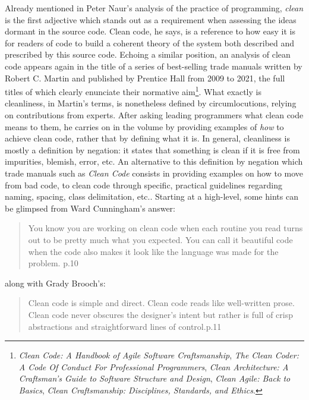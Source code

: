 Already mentioned in Peter Naur's analysis of the practice of programming, \emph{clean} is the first adjective which stands out as a requirement when assessing the ideas dormant in the source code. Clean code, he says, is a reference to how easy it is for readers of code to build a coherent theory of the system both described and prescribed by this source code\cite{naur_programming_1985}. Echoing a similar position, an analysis of clean code appears again in the title of a series of best-selling trade manuals written by Robert C. Martin and published by Prentice Hall from 2009 to 2021, the full titles of which clearly enunciate their normative aim\footnote{\emph{Clean Code: A Handbook of Agile Software Craftsmanship}, \emph{The Clean Coder: A Code Of Conduct For Professional Programmers}, \emph{Clean Architecture: A Craftsman's Guide to Software Structure and Design}, \emph{Clean Agile: Back to Basics}, \emph{Clean Craftsmanship: Disciplines, Standards, and Ethics}.}. What exactly is cleanliness, in Martin's terms, is nonetheless defined by circumlocutions, relying on contributions from experts. After asking leading programmers what clean code means to them, he carries on in the volume by providing examples of \emph{how} to achieve clean code, rather that by defining what it is. In general, cleanliness is mostly a definition by negation: it states that something is clean if it is free from impurities, blemish, error, etc. An alternative to this definition by negation which trade manuals such as \emph{Clean Code} consists in providing examples on how to move from bad code, to clean code through specific, practical guidelines regarding naming, spacing, class delimitation, etc.. Starting at a high-level, some hints can be glimpsed from Ward Cunningham's answer:

\begin{quote}
  You know you are working on clean code when each routine you read turns out to be pretty much what you expected. You can call it beautiful code when the code also makes it look like the language was made for the problem.\cite{martin_clean_2008} p.10
\end{quote}

along with Grady Brooch's:

\begin{quote}
  Clean code is simple and direct. Clean code reads like well-written prose. Clean code never obscures the designer’s intent but rather is full of crisp abstractions and straightforward lines of control.\cite{martin_clean_2008}p.11
\end{quote}

